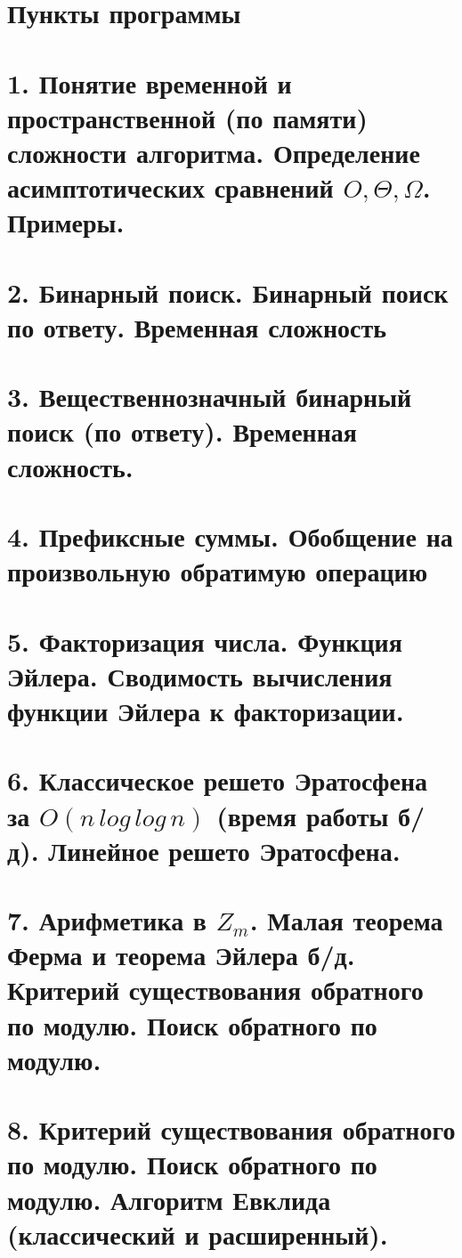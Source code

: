 \section{Пункты программы}

\section{1. Понятие временной и пространственной (по памяти) сложности алгоритма. Определение асимптотических сравнений $O, \Theta, \Omega$. Примеры.}


\section{2. Бинарный поиск. Бинарный поиск по ответу. Временная сложность}


\section{3. Вещественнозначный бинарный поиск (по ответу). Временная сложность.}


\hypertarget{prefsum}{}
\section{4. Префиксные суммы. Обобщение на произвольную обратимую операцию}


\section{5. Факторизация числа. Функция Эйлера. Сводимость вычисления функции Эйлера к факторизации.}


\section{6. Классическое решето Эратосфена за $O(n\,log\,log\,n)$ (время работы б/д). Линейное решето Эратосфена.}


\section{7. Арифметика в $Z_m$. Малая теорема Ферма и теорема Эйлера б/д. Критерий существования обратного по модулю. Поиск обратного по модулю.}


\section{8. Критерий существования обратного по модулю. Поиск обратного по модулю. Алгоритм Евклида (классический и расширенный).}


